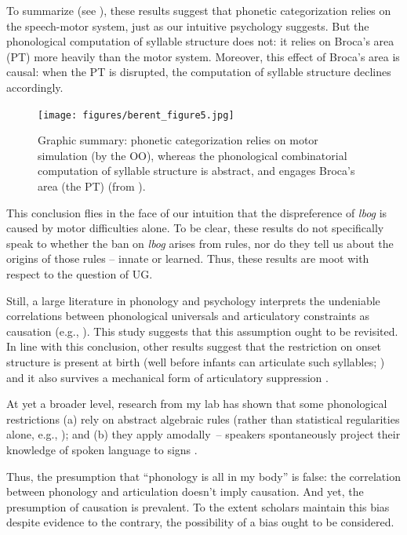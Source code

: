 \documentclass[output=paper,colorlinks,citecolor=brown
]{langscibook}
\begin{document}
To summarize (see ), these results suggest that phonetic categorization relies on the speech-motor system, just as our intuitive psychology suggests. But the phonological computation of syllable structure does not: it relies on Broca’s area (PT) more heavily than the motor system. Moreover, this effect of Broca’s area is causal: when the PT is disrupted, the computation of syllable structure declines accordingly.

\begin{figure}
    \centering
    \texttt{[image: figures/berent\_figure5.jpg]}
    \caption{Graphic summary: phonetic categorization relies on motor simulation (by the OO), whereas the phonological combinatorial computation of syllable structure is abstract, and engages Broca’s area (the PT) (from \cite{berent2023phonetic}). }
    \label{fig:figure5}
\end{figure}

This conclusion flies in the face of our intuition that the dispreference of \textit{lbog} is caused by motor difficulties alone. To be clear, these results do not specifically speak to whether the ban on \textit{lbog} arises from rules, nor do they tell us about the origins of those rules -- innate or learned. Thus, these results are moot with respect to the question of UG. 

Still, a large literature in phonology and psychology interprets the undeniable correlations between phonological universals and articulatory constraints as causation (e.g., \cite{hayes2004phonetically}). This study suggests that this assumption ought to be revisited. In line with this conclusion, other results suggest that the restriction on onset structure is present at birth (well before infants can articulate such syllables; \cite{gomez2014language}) and it also survives a mechanical form of articulatory suppression \citep{berent2022phonology}. 

At yet a broader level, research from my lab has shown that some phonological restrictions (a) rely on abstract algebraic rules (rather than statistical regularities alone, e.g., \cite{berent2002scope,gervain2012binding}); and (b) they apply amodally~-- speakers spontaneously project their knowledge of spoken language to signs \citep{berent2021amodal,berent2016double,berent2020knowledge,berent2021infants,berent2023phonetic}. 

Thus, the presumption that ``phonology is all in my body'' is false: the correlation between phonology and articulation doesn’t imply causation. And yet, the presumption of causation is prevalent. To the extent scholars maintain this bias despite evidence to the contrary, the possibility of a bias ought to be considered. 
\end{document}
